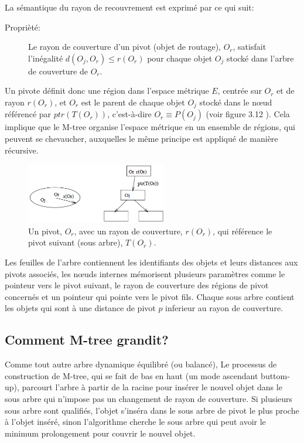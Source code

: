 La sémantique du rayon de recouvrement est exprimé par ce qui suit:
\begin{description}
	\item[Proprièté:] Le rayon de couverture d'un pivot (objet de routage), $ O_r $, satisfait l'inégalité $ d(O_j, O_r) \le r(O_r) $ pour chaque objet $ O_j $ stocké dans l'arbre de couverture de $ O_r $.
\end{description}

Un pivote définit donc une région dans l'espace métrique $ E $, centrée sur $ O_r $ et de rayon $ r(O_r) $, et $ O_r $ est le parent de chaque objet $ O_j $ stocké dans le nœud référencé par $ ptr(T(O_r)) $, c'est-à-dire $ O_r \equiv P(O_j)$ (voir figure 3.12 ).  Cela implique que le M-tree organise l'espace métrique en un ensemble de régions, qui peuvent se chevaucher, auxquelles le même principe est appliqué de manière récursive.

\begin{figure}[H]
	\centering
	\includegraphics[width=0.55\textwidth]{Figures/mtree.png} %
	\caption{ Un pivot, $ O_r $, avec un rayon de couverture, $  r(O_r) $, qui référence le pivot suivant (sous arbre), $ T(O_r) $.}
\end{figure}

Les feuilles de l’arbre contiennent les identifiants des objets et leurs distances aux pivots associés, les nœuds internes mémorisent plusieurs paramètres comme le pointeur vers le pivot suivant, le rayon de couverture des régions de pivot concernés et un pointeur qui pointe vers le pivot fils. Chaque sous arbre contient les objets qui sont à une distance de pivot $ p $ inferieur au rayon de couverture.\\

\subsection{Comment M-tree grandit?}

Comme tout autre arbre dynamique équilibré (ou balancé), Le processus de construction de M-tree, qui se fait de bas en haut (un mode ascendant buttom-up), parcourt l'arbre à partir de la racine pour insérer le nouvel objet dans le sous arbre qui n'impose pas un changement de rayon de couverture. Si plusieurs sous arbre sont qualifiés, l'objet s'inséra dans le sous arbre de pivot le plus proche à l'objet inséré, sinon l'algorithme cherche le sous arbre qui peut avoir le minimum prolongement pour couvrir le nouvel objet.\\

